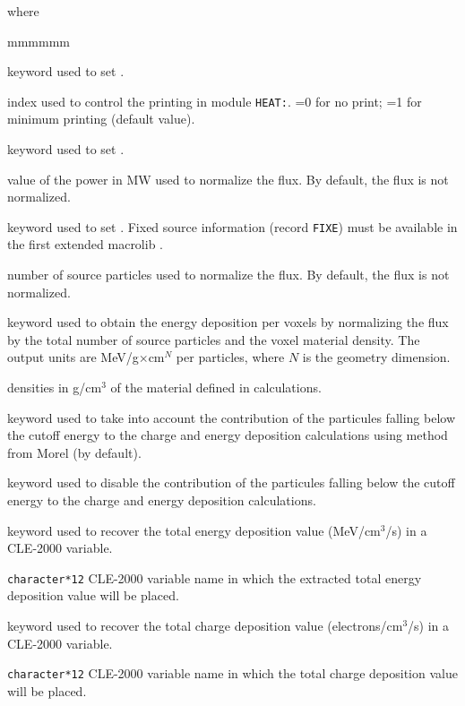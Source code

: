 \noindent where
\begin{ListeDeDescription}{mmmmmm}

\item[\moc{EDIT}] keyword used to set .

\item[\dusa{iprint}] index used to control the printing in module {\tt HEAT:}. =0 for no print; =1 for minimum printing (default value).

\item[\moc{POWR}] keyword used to set .

\item[\dusa{power}] value of the power in MW used to normalize the flux. By default, the flux is not normalized.

\item[\moc{SOUR}] keyword used to set . Fixed source information (record {\tt FIXE}) must be available in the first extended macrolib .

\item[\dusa{snumb}] number of source particles used to normalize the flux. By default, the flux is not normalized.

\item[\moc{NORM}] keyword used to obtain the energy deposition per voxels by normalizing the flux by the total number of source particles and the voxel material density. The output units are MeV/g$\times$cm$^{N}$ per particles, where $N$ is the geometry dimension.

\item[\dusa{rho}] densities in g/cm$^{3}$ of the  material defined in calculations.

\item[\moc{BC}]  keyword used to take into account the contribution of the particules falling below the cutoff energy to the charge and energy deposition calculations using method from Morel\cite{morel1996} (by default).

\item[\moc{NBC}] keyword used to disable the contribution of the particules falling below the cutoff energy to the charge and energy deposition calculations.

\item[\moc{PICKE}]  keyword used to recover the total energy deposition value (MeV/cm$^{3}$/s) in a CLE-2000 variable.

\item[\dusa{esum}] \texttt{character*12} CLE-2000 variable name in which the extracted total energy deposition value will be placed.

\item[\moc{PICKC}]  keyword used to recover the total charge deposition value (electrons/cm$^{3}$/s) in a CLE-2000 variable.

\item[\dusa{csum}] \texttt{character*12} CLE-2000 variable name in which the total charge deposition value will be placed.

\end{ListeDeDescription}
\clearpage
